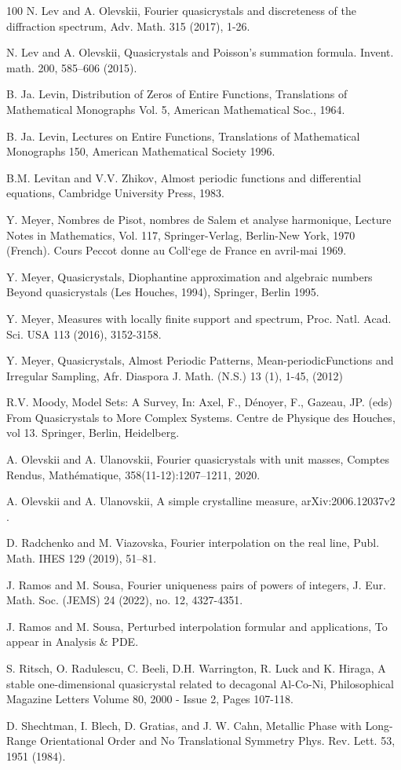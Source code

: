 \documentclass[a4paper,reqno,12pt]{amsart}
\newcommand{\1}{{\bf 1}}
\renewcommand{\1}{{\bo 1}}
\begin{document}
\begin{thebibliography}{100}
 N. Lev and A. Olevskii, Fourier quasicrystals and discreteness of the diffraction spectrum, Adv. Math. 315 (2017), 1-26.

 N. Lev and A. Olevskii, Quasicrystals and Poisson’s summation formula. Invent. math. 200, 585–606 (2015). 

B. Ja. Levin,
Distribution of Zeros of Entire Functions, Translations of Mathematical Monographs Vol. 5, American Mathematical Soc., 1964.

B. Ja. Levin,
Lectures on Entire Functions, Translations of Mathematical Monographs 150, American Mathematical Society 1996.

B.M. Levitan and V.V. Zhikov,
Almost periodic functions and differential equations, Cambridge University Press, 1983.


 Y. Meyer, Nombres de Pisot, nombres de Salem et analyse harmonique, Lecture Notes in Mathematics, Vol. 117, Springer-Verlag, Berlin-New York, 1970 (French). Cours Peccot donne au Coll`ege de France en avril-mai 1969. 

 Y. Meyer, Quasicrystals, Diophantine approximation and algebraic numbers
Beyond quasicrystals (Les Houches, 1994), Springer, Berlin 1995.

 Y. Meyer, Measures with locally finite support and spectrum, Proc. Natl. Acad. Sci. USA 113 (2016), 3152-3158.

 Y. Meyer, Quasicrystals, Almost Periodic Patterns, Mean-periodicFunctions and Irregular Sampling,
Afr. Diaspora J. Math. (N.S.) 13 (1), 1-45, (2012)

 R.V. Moody, Model Sets: A Survey, In: Axel, F., Dénoyer, F., Gazeau, JP. (eds) From Quasicrystals to More Complex Systems. Centre de Physique des Houches, vol 13. Springer, Berlin, Heidelberg. 

A. Olevskii and A. Ulanovskii, Fourier quasicrystals with unit masses, Comptes Rendus, Mathématique, 358(11-12):1207–1211, 2020.

A. Olevskii and A. Ulanovskii, A simple crystalline measure, arXiv:2006.12037v2 .

D. Radchenko and M. Viazovska, Fourier interpolation on the real line, Publ. Math. IHES 129 (2019), 51–81.

J. Ramos and M. Sousa, Fourier uniqueness pairs of powers of integers, J. Eur. Math. Soc. (JEMS) 24 (2022), no. 12, 4327-4351.

J. Ramos and M. Sousa, Perturbed interpolation formular and applications, To appear in Analysis \& PDE.

S. Ritsch, O. Radulescu, C. Beeli, D.H. Warrington, R. Luck and K. Hiraga, A stable one-dimensional quasicrystal related to decagonal Al-Co-Ni, Philosophical Magazine Letters 
Volume 80, 2000 - Issue 2, Pages 107-118.

D. Shechtman, I. Blech, D. Gratias, and J. W. Cahn,
Metallic Phase with Long-Range Orientational Order and No Translational Symmetry Phys. Rev. Lett. 53, 1951 (1984).


\end{thebibliography}
\end{document}
